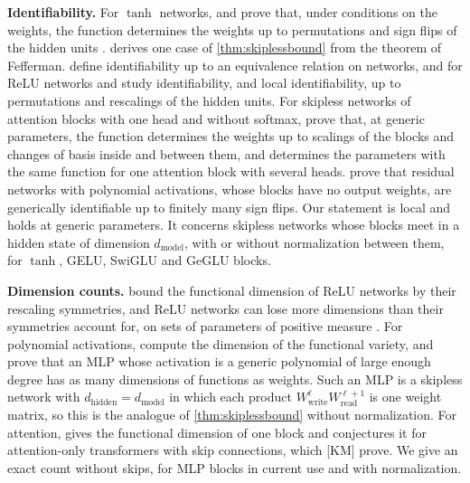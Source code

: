 \documentclass[10pt]{article}
\theoremstyle{definition}
\theoremstyle{remark}
\newcommand{\Wread}{W_{\mathrm{read}}}
\newcommand{\Wwrite}{W_{\mathrm{write}}}
\newcommand{\dm}{d_{\mathrm{model}}}
\newcommand{\dhid}{d_{\mathrm{hidden}}}
\newcommand{\para}[1]{\smallskip\noindent\textbf{#1}\hspace{0.5em}}
\begin{document}
\para{Identifiability.} For $\tanh$ networks, \citet{sussmann1992} and \citet{fefferman1994} prove that, under conditions on the weights, the function determines the weights up to permutations and sign flips of the hidden units \citep[see also][]{hechtnielsen1989theory,chen1993geometry,kurkova1994functionally}.  derives one case of \cref{thm:skiplessbound} from the theorem of Fefferman. \citet{vlacic2020affine} define identifiability up to an equivalence relation on networks, and for ReLU networks \citet{stock2021embedding} and \citet{bonapellissier2022local} study identifiability, and local identifiability, up to permutations and rescalings of the hidden units. For skipless networks of attention blocks with one head and without softmax, \citet{henry2025lightning} prove that, at generic parameters, the function determines the weights up to scalings of the blocks and changes of basis inside and between them, and \citet{henry2026generic} determines the parameters with the same function for one attention block with several heads. \citet{dahlgren2026polynomial} prove that residual networks with polynomial activations, whose blocks have no output weights, are generically identifiable up to finitely many sign flips. Our statement is local and holds at generic parameters. It concerns skipless networks whose blocks meet in a hidden state of dimension $\dm$, with or without normalization between them, for $\tanh$, GELU, SwiGLU and GeGLU blocks.

\para{Dimension counts.} \citet{grigsby2022functional} bound the functional dimension of ReLU networks by their rescaling symmetries, and ReLU networks can lose more dimensions than their symmetries account for, on sets of parameters of positive measure \citep{grigsby2023hidden}. For polynomial activations, \citet{kileel2019expressive} compute the dimension of the functional variety, and \citet[Theorem~4.1]{shahverdi2026razor} prove that an MLP whose activation is a generic polynomial of large enough degree has as many dimensions of functions as weights. Such an MLP is a skipless network with $\dhid = \dm$ in which each product $\Wwrite^{\ell}\Wread^{\ell+1}$ is one weight matrix, so this is the analogue of \cref{thm:skiplessbound} without normalization. For attention, \citet{henry2026generic} gives the functional dimension of one block and conjectures it for attention-only transformers with skip connections, which [KM] prove. We give an exact count without skips, for MLP blocks in current use and with normalization.
\end{document}
